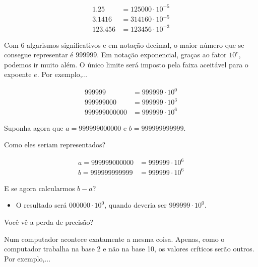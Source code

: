 \documentclass[11pt]{article}
\providecommand{\tightlist}{%
      \setlength{\itemsep}{0pt}\setlength{\parskip}{0pt}}
\begin{document}
\begin{align*}
1.25 &= 125000 \cdot 10^{-5} \\
3.1416 &= 314160 \cdot 10^{-5} \\
123.456 &= 123456 \cdot 10^{-3}
\end{align*}

    Com \(6\) algarismos significativos e em notação decimal, o maior número
que se consegue representar é \(999999\). Em notação exponencial, graças
ao fator \(10^e\), podemos ir muito além. O único limite será imposto
pela faixa aceitável para o expoente \(e\). Por exemplo,...

\begin{align*}
999999 &= 999999 \cdot 10^{0} \\
999999000 &= 999999 \cdot 10^{3} \\
999999000000 &= 999999 \cdot 10^{6}
\end{align*}

    Suponha agora que \(a = 999999000000\) e \(b = 999999999999\).

Como eles seriam representados?

\begin{align*}
a = 999999000000 &= 999999 \cdot 10^{6} \\
b = 999999999999 &= 999999 \cdot 10^{6}
\end{align*}

E se agora calcularmos \(b - a\)? 
\begin{itemize}
\tightlist
\item
O resultado será
\(000000 \cdot 10^0\), quando deveria ser \(999999 \cdot 10^0\).
\end{itemize}

    Você vê a perda de precisão?

Num computador acontece exatamente a mesma coisa. Apenas, como o
computador trabalha na base 2 e não na base 10, os valores críticos
serão outros. Por exemplo,...
\end{document}
